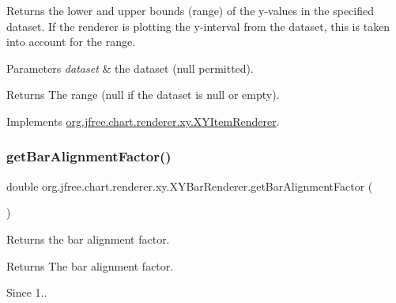 Returns the lower and upper bounds (range) of the y-\/values in the specified dataset. If the renderer is plotting the y-\/interval from the dataset, this is taken into account for the range.


\begin{DoxyParams}{Parameters}
{\em dataset} & the dataset ({\ttfamily null} permitted).\\
\hline
\end{DoxyParams}
\begin{DoxyReturn}{Returns}
The range ({\ttfamily null} if the dataset is {\ttfamily null} or empty). 
\end{DoxyReturn}


Implements \mbox{\hyperlink{interfaceorg_1_1jfree_1_1chart_1_1renderer_1_1xy_1_1_x_y_item_renderer_af9ac6f440e99c73d343de7851e89496a}{org.\+jfree.\+chart.\+renderer.\+xy.\+X\+Y\+Item\+Renderer}}.

\mbox{\label{classorg_1_1jfree_1_1chart_1_1renderer_1_1xy_1_1_x_y_bar_renderer_a06bc29edec347eceddb15378b7f4bfa5}} 
\subsubsection{\texorpdfstring{get\+Bar\+Alignment\+Factor()}{getBarAlignmentFactor()}}
{\footnotesize\ttfamily double org.\+jfree.\+chart.\+renderer.\+xy.\+X\+Y\+Bar\+Renderer.\+get\+Bar\+Alignment\+Factor (\begin{DoxyParamCaption}{ }\end{DoxyParamCaption})}

Returns the bar alignment factor.

\begin{DoxyReturn}{Returns}
The bar alignment factor.
\end{DoxyReturn}
\begin{DoxySince}{Since}
1.. 
\end{DoxySince}
\mbox{\label{classorg_1_1jfree_1_1chart_1_1renderer_1_1xy_1_1_x_y_bar_renderer_aee4b0ac150028ad2139eb895604c4e29}} 
